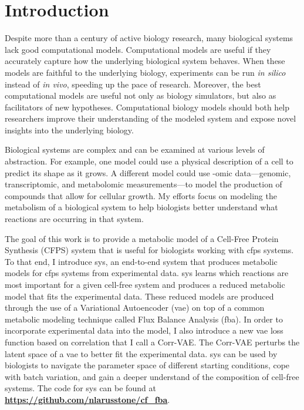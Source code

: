 \chapter{Introduction}
\setcounter{page}{1} 

Despite more than a century of active biology research, many biological systems lack good computational models.
Computational models are useful if they accurately capture how the underlying biological system behaves.
When these models are faithful to the underlying biology, experiments can be run \textit{in silico} instead of \textit{in vivo}, speeding up the pace of research.
Moreover, the best computational models are useful not only as biology simulators, but also as facilitators of new hypotheses.
Computational biology models should both help researchers improve their understanding of the modeled system and expose novel insights into the underlying biology.

Biological systems are complex and can be examined at various levels of abstraction.
For example, one model could use a physical description of a cell to predict its shape as it grows.
A different model could use -omic data---genomic, transcriptomic, and metabolomic measurements---to model the production of compounds that allow for cellular growth.
My efforts focus on modeling the metabolism of a biological system to help biologists better understand what reactions are occurring in that system.

The goal of this work is to provide a metabolic model of a Cell-Free Protein Synthesis (CFPS) system that is useful for biologists working with \gls{cfps} systems.
To that end, I introduce \gls{sys}, an end-to-end system that produces metabolic models for \gls{cfps} systems from experimental data.
\gls{sys} learns which reactions are most important for a given cell-free system and produces a reduced metabolic model that fits the experimental data.
These reduced models are produced through the use of a Variational Autoencoder (\gls{vae}) on top of a common metabolic modeling technique called Flux Balance Analysis (\gls{fba}).
In order to incorporate experimental data into the model, I also introduce a new \gls{vae} loss function based on correlation that I call a Corr-VAE.
The Corr-VAE perturbs the latent space of a \gls{vae} to better fit the experimental data.
\gls{sys} can be used by biologists to navigate the parameter space of different starting conditions, cope with batch variation, and gain a deeper understand of the composition of cell-free systems.
The code for \gls{sys} can be found at \textbf{\url{https://github.com/nlarusstone/cf_fba}}.

